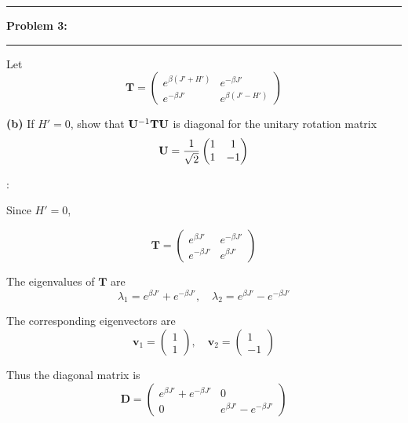 \documentclass[11pt]{article}
\newcommand\question[2]{\vspace{.25in}\hrule\textbf{#1: #2}\vspace{.5em}\hrule\vspace{.10in}}
\renewcommand\part[1]{\vspace{.10in}\textbf{(#1)}}
\begin{document}
\question{Problem 3}{}

Let 
\begin{equation}
    \mathbf{T} = \begin{pmatrix}
        e^{\beta(J' + H')} & e^{-\beta J'} \\
        e^{-\beta J'} & e^{\beta(J' - H')}
    \end{pmatrix}
\end{equation}

\part{b} 
If $H' = 0$, show that $\mathbf{U}^{-1}\mathbf{T}\mathbf{U}$ is diagonal for the unitary rotation matrix
\begin{equation}
    \mathbf{U} = \frac{1}{\sqrt{2}}\begin{pmatrix}
        1 & 1 \\
        1 & -1
    \end{pmatrix}
\end{equation}

\solution:

Since $H'=0$, 

\begin{equation}
    \mathbf{T} = \begin{pmatrix}
        e^{\beta J'} & e^{-\beta J'} \\
        e^{-\beta J'} & e^{\beta J'}
    \end{pmatrix}
\end{equation}

The eigenvalues of $\mathbf{T}$ are
\begin{equation}
    \lambda_1 = e^{\beta J'} + e^{-\beta J'}, \quad \lambda_2 = e^{\beta J'} - e^{-\beta J'}
\end{equation}

The corresponding eigenvectors are
\begin{equation}
    \mathbf{v}_1 = \begin{pmatrix}
        1 \\
        1
    \end{pmatrix}, \quad \mathbf{v}_2 = \begin{pmatrix}
        1 \\
        -1
    \end{pmatrix}
\end{equation}

Thus the diagonal matrix is
\begin{equation}
    \mathbf{D} = \begin{pmatrix}
        e^{\beta J'} + e^{-\beta J'} & 0 \\
        0 & e^{\beta J'} - e^{-\beta J'}
    \end{pmatrix}
\end{equation}
\end{document}
